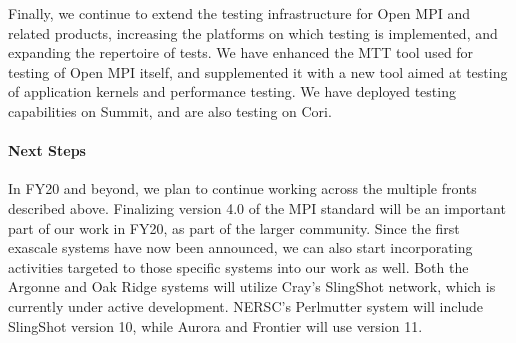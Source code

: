 Finally, we continue to extend the testing infrastructure for Open MPI and related products, increasing the platforms on which testing is implemented, and expanding the repertoire of tests.  We have enhanced the MTT tool used for testing of Open MPI itself, and supplemented it with a new tool aimed at testing of application kernels and performance testing.  We have deployed testing capabilities on Summit, and are also testing on Cori.




\paragraph{Next Steps}
In FY20 and beyond, we plan to continue working across the multiple fronts described above.  Finalizing version 4.0 of the MPI standard will be an important part of our work in FY20, as part of the larger community.  Since the first exascale systems have now been announced, we can also start incorporating activities targeted to those specific systems into our work as well.  Both the Argonne and Oak Ridge systems will utilize Cray's SlingShot network, which is currently under active development.  NERSC's Perlmutter system will include SlingShot version 10, while Aurora and Frontier will use version 11.
